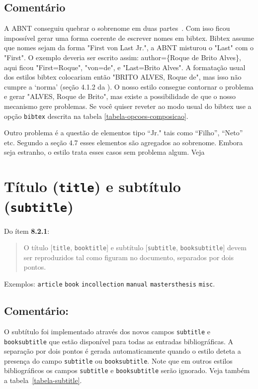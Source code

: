 \documentclass[espacosimples]{abnt}
\begin{document}
\subsection{Comentário}
A ABNT conseguiu quebrar o sobrenome em duas partes~\cite{NBR10523:1988}. 
Com isso ficou impossível
gerar uma forma coerente de escrever nomes em bibtex.
Bibtex assume que nomes sejam da forma "First von Last Jr.", a ABNT misturou
o "Last" com o "First". O exemplo  deveria ser
escrito assim: author=\{Roque de Brito Alves\}, aqui ficou "First=Roque",
"von=de",  e "Last=Brito Alves". A formatação usual dos 
estilos bibtex colocariam então "BRITO ALVES, Roque de",  mas isso não  cumpre
a `norma' (seção 4.1.2 da \cite{NBR10523:1988}). 
O nosso estilo consegue contornar o problema e gerar "ALVES, Roque de Brito",
mas existe a possibilidade de que o nosso mecanismo gere problemas.
Se você quiser reveter ao modo usual do bibtex use a opção
{\tt bibtex} descrita na tabela \ref{tabela-opcoes-composicao}.

Outro problema é a questão de elementos tipo ``Jr." tais como ``Filho'',
``Neto'' etc. Segundo a seção 4.7 \cite{NBR10523:1988} 
esses elementos são agregados ao sobrenome.
Embora seja estranho, o estilo trata esses casos sem problema algum.
Veja 

\section{Título ({\tt title}) e subtítulo ({\tt subtitle})}

Do ítem {\bf 8.2.1}\cite{NBR6023:2000}:
\begin{quote}
O título [{\tt title}, {\tt booktitle}] e subtítulo [{\tt subtitle}, {\tt booksubtitle}] devem ser reproduzidos
tal como figuram no documento, separados por dois pontos.
\end{quote}

Exemplos:
{\tt article}\cite{7.4.2.3-2}
{\tt book}\cite{7.1.3-5,7.1.3-10,7.10-3,8.1.1.1-3,8.2.1,8.5.3}
{\tt incollection}\cite{7.2.2-1}
{\tt manual}\cite{NBR6023:2000,7.1.3-7,7.1.3-8,7.1.3-9,7.10-4,8.1.2.1-1}
{\tt mastersthesis}\cite{8.11.4-2}
{\tt misc}\cite{7.13.2-1}.

\subsection{Comentário:}
O subtítulo foi implementado através dos novos campos {\tt subtitle}
e {\tt booksubtitle} que
estão disponível para todas as entradas bibliográficas.
A separação por dois pontos é gerada automaticamente quando o estilo
deteta a presença do campo {\tt subtitle} ou {\tt booksubtitle}.
Note que em outros estilos bibliográficos os campos {\tt subtitle}
e {\tt booksubtitle} serão
ignorado.
Veja também a tabela~\ref{tabela-subtitle}.
\end{document}
